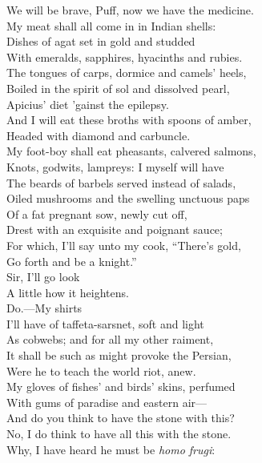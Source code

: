 \documentclass[a4paper,oneside,12pt]{memoir}
\begin{document}
\begin{drama*}
We will be brave, Puff, now we have the medicine.\\
My meat shall all come in in Indian shells:\\
Dishes of agat set in gold and studded\\
With emeralds, sapphires, hyacinths and rubies.\\
The tongues of carps, dormice and camels' heels,\\
Boiled in the spirit of sol and dissolved pearl,\\
Apicius' diet 'gainst the epilepsy.\\
And I will eat these broths with spoons of amber,\\
Headed with diamond and carbuncle.\\
My foot-boy shall eat pheasants, calvered salmons,\\
Knots, godwits, lampreys: I myself will have\\
The beards of barbels served instead of salads,\\
Oiled mushrooms and the swelling unctuous paps\\
Of a fat pregnant sow, newly cut off,\\
Drest with an exquisite and poignant sauce;\\
For which, I'll say unto my cook, ``There's gold,\\
Go forth and be a knight.''\\
\facespeaks {} Sir, I'll go look\\
A little how it heightens.\\
\mammonspeaks {} Do.---My shirts\\
I'll have of taffeta-sarsnet, soft and light\\
As cobwebs; and for all my other raiment,\\
It shall be such as might provoke the Persian,\\
Were he to teach the world riot, anew.\\
My gloves of fishes' and birds' skins, perfumed\\
With gums of paradise and eastern air---\\
\surlyspeaks And do you think to have the stone with this?\\
\mammonspeaks No, I do think to have all this with the stone.\\
\surlyspeaks Why, I have heard he must be \emph{homo frugi}:\\

\end{drama*}
\end{document}
